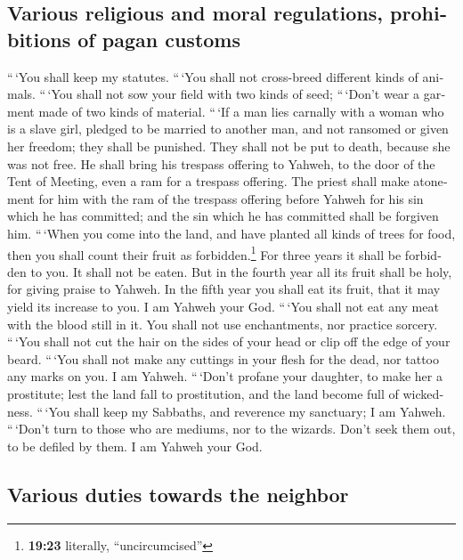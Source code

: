 \begin{paracol}{2}
\begin{otherlanguage}{english}
\hypertarget{various-religious-and-moral-regulations-prohibitions-of-pagan-customs}{%
\subsection{Various religious and moral regulations, prohibitions of
pagan
customs}\label{various-religious-and-moral-regulations-prohibitions-of-pagan-customs}}

 ``\,`You shall keep my statutes. ``\,`You shall not
cross-breed different kinds of animals. ``\,`You shall not sow your
field with two kinds of seed; ``\,`Don't wear a garment made of two
kinds of material.  ``\,`If a man lies carnally with a
woman who is a slave girl, pledged to be married to another man, and not
ransomed or given her freedom; they shall be punished. They shall not be
put to death, because she was not free.  He shall bring
his trespass offering to Yahweh, to the door of the Tent of Meeting,
even a ram for a trespass offering.  The priest shall
make atonement for him with the ram of the trespass offering before
Yahweh for his sin which he has committed; and the sin which he has
committed shall be forgiven him.  ``\,`When you come into
the land, and have planted all kinds of trees for food, then you shall
count their fruit as forbidden.\footnote{\textbf{19:23} literally,
  ``uncircumcised''} For three years it shall be forbidden to you. It
shall not be eaten.  But in the fourth year all its fruit
shall be holy, for giving praise to Yahweh.  In the fifth
year you shall eat its fruit, that it may yield its increase to you. I
am Yahweh your God.  ``\,`You shall not eat any meat with
the blood still in it. You shall not use enchantments, nor practice
sorcery.  ``\,`You shall not cut the hair on the sides of
your head or clip off the edge of your beard.  ``\,`You
shall not make any cuttings in your flesh for the dead, nor tattoo any
marks on you. I am Yahweh.  ``\,`Don't profane your
daughter, to make her a prostitute; lest the land fall to prostitution,
and the land become full of wickedness.  ``\,`You shall
keep my Sabbaths, and reverence my sanctuary; I am Yahweh.
 ``\,`Don't turn to those who are mediums, nor to the
wizards. Don't seek them out, to be defiled by them. I am Yahweh your
God.

\hypertarget{various-duties-towards-the-neighbor}{%
\subsection{Various duties towards the
neighbor}\label{various-duties-towards-the-neighbor}}


\end{otherlanguage}
\end{paracol}
